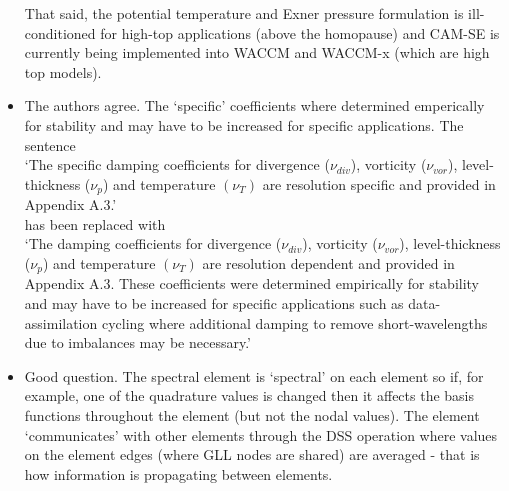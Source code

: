 \documentclass[11pt]{article}
\begin{document}
\begin{itemize}
That said, the potential temperature and Exner pressure formulation is ill-conditioned for high-top applications (above the homopause) and CAM-SE is currently being implemented into WACCM and WACCM-x (which are high top models).



\item {\color{blue}{Also in section 2.6: You make reference to the ``specific damping coefficients''. Shouldn't these be runtime-parameters? I presume that the best value of the damping will depend on the application (for example, data assimilation cycling may benefit from additional damping to remove short-wavelength waves due to imbalances) and may not be a simple function of resolution.}}

The authors agree. The `specific' coefficients where determined emperically for stability and may have to be increased for specific applications. The sentence\\

`The specific damping coefficients for divergence ($\nu_{div}$), vorticity ($\nu_{vor}$), level-thickness ($\nu_p$) and temperature $(\nu_T)$ are resolution specific and provided in Appendix A.3.'\\

has been replaced with \\

`The damping coefficients for divergence ($\nu_{div}$), vorticity ($\nu_{vor}$), level-thickness ($\nu_p$) and temperature $(\nu_T)$ are resolution dependent and provided in Appendix A.3. These coefficients were determined empirically for stability and may have to be increased for specific applications such as data-assimilation cycling where additional damping to remove short-wavelengths due to imbalances may be necessary.'

\item {\color{blue}{ Section 3.3: I am unfamiliar with the spectral element method. In traditional finite-differencing schemes there is a well defined way for each grid point to be influenced by its neighbors. How does each element communicate with one another? Is it by the shared points on the edges of each element? Also, if indeed it is only by the edge points, then wouldn't a broader domain of dependence (with more points) be needed for a higher-order method?}}

Good question. The spectral element is `spectral' on each element so if, for example, one of the quadrature values is changed then it affects the basis functions throughout the element (but not the nodal values). The element `communicates' with other elements through the DSS operation where values on the element edges (where GLL nodes are shared) are averaged - that is how information is propagating between elements.\\


\end{itemize}
\end{document}
